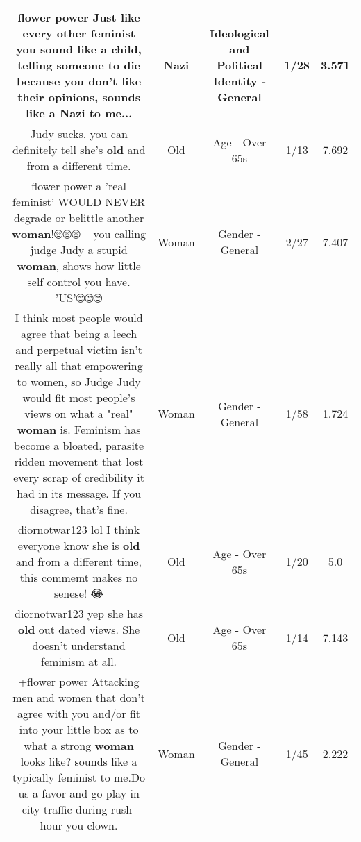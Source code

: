 \documentclass[11pt]{article}
\newlength\mylength
\begin{document}
\begin{center}
\begin{longtable}{|C{.65\mylength}|C{.30\mylength}|C{.12\mylength}|C{.12\mylength}|C{.12\mylength}|}
  \small flower power Just like every other feminist you sound like a child, telling someone to die because you don't like their opinions, sounds like a \textbf{Nazi} to me...\normalsize   & Nazi &  Ideological and Political Identity - General & 1/28 & 3.571 \\  \hline
  \small Judy sucks, you can definitely tell she's \textbf{old} and from a different time.\normalsize   & Old & Age - Over 65s & 1/13 & 7.692 \\  \hline
  \small flower power  a 'real feminist' WOULD NEVER degrade or belittle another \textbf{woman}!🙄🙄🙄🤦🏻‍♀️ you calling judge Judy a stupid \textbf{woman}, shows how little self control you have. 'US'🙄🙄🙄\normalsize   & Woman & Gender - General & 2/27 & 7.407 \\  \hline
  \small I think most people would agree that being a leech and perpetual victim isn't really all that empowering to women, so Judge Judy would fit most people's views on what a "real" \textbf{woman} is. Feminism has become a bloated, parasite ridden movement that lost every scrap of credibility it had in its message. If you disagree, that's fine.\normalsize   & Woman & Gender - General & 1/58 & 1.724 \\  \hline
  \small diornotwar123 lol I think everyone know she is \textbf{old} and from a different time, this commemt makes no senese! 😂\normalsize   & Old & Age - Over 65s & 1/20 & 5.0 \\  \hline
  \small diornotwar123 yep she has \textbf{old} out dated views. She doesn't understand feminism at all.\normalsize   & Old & Age - Over 65s & 1/14 & 7.143 \\  \hline
  \small +flower power Attacking men and women that don't agree with you and/or fit into your little box as to what a strong \textbf{woman} looks like? sounds like a typically feminist to me.Do us a favor and go play in city traffic during rush-hour you clown.\normalsize   & Woman & Gender - General & 1/45 & 2.222 \\  \hline

\end{longtable}
\end{center}
\end{document}
